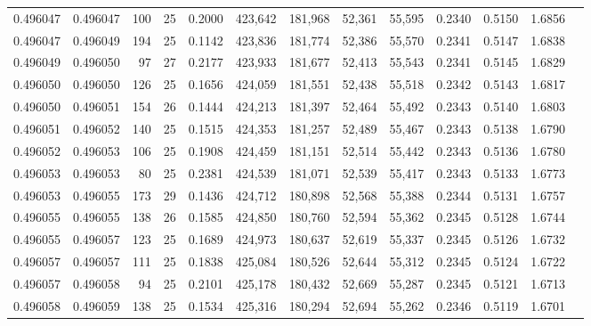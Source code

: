\begin{tabular}{rrrrrrrrrrrrr}
0.496047 & 0.496047 & 100 &  25 &                                     0.2000 & 423,642 & 181,968 &  52,361 &  55,595 & 0.2340 & 0.5150 & 1.6856 \\
0.496047 & 0.496049 & 194 &  25 &                                     0.1142 & 423,836 & 181,774 &  52,386 &  55,570 & 0.2341 & 0.5147 & 1.6838 \\
0.496049 & 0.496050 &  97 &  27 &                                     0.2177 & 423,933 & 181,677 &  52,413 &  55,543 & 0.2341 & 0.5145 & 1.6829 \\
0.496050 & 0.496050 & 126 &  25 &                                     0.1656 & 424,059 & 181,551 &  52,438 &  55,518 & 0.2342 & 0.5143 & 1.6817 \\
0.496050 & 0.496051 & 154 &  26 &                                     0.1444 & 424,213 & 181,397 &  52,464 &  55,492 & 0.2343 & 0.5140 & 1.6803 \\
0.496051 & 0.496052 & 140 &  25 &                                     0.1515 & 424,353 & 181,257 &  52,489 &  55,467 & 0.2343 & 0.5138 & 1.6790 \\
0.496052 & 0.496053 & 106 &  25 &                                     0.1908 & 424,459 & 181,151 &  52,514 &  55,442 & 0.2343 & 0.5136 & 1.6780 \\
0.496053 & 0.496053 &  80 &  25 &                                     0.2381 & 424,539 & 181,071 &  52,539 &  55,417 & 0.2343 & 0.5133 & 1.6773 \\
0.496053 & 0.496055 & 173 &  29 &                                     0.1436 & 424,712 & 180,898 &  52,568 &  55,388 & 0.2344 & 0.5131 & 1.6757 \\
0.496055 & 0.496055 & 138 &  26 &                                     0.1585 & 424,850 & 180,760 &  52,594 &  55,362 & 0.2345 & 0.5128 & 1.6744 \\
0.496055 & 0.496057 & 123 &  25 &                                     0.1689 & 424,973 & 180,637 &  52,619 &  55,337 & 0.2345 & 0.5126 & 1.6732 \\
0.496057 & 0.496057 & 111 &  25 &                                     0.1838 & 425,084 & 180,526 &  52,644 &  55,312 & 0.2345 & 0.5124 & 1.6722 \\
0.496057 & 0.496058 &  94 &  25 &                                     0.2101 & 425,178 & 180,432 &  52,669 &  55,287 & 0.2345 & 0.5121 & 1.6713 \\
0.496058 & 0.496059 & 138 &  25 &                                     0.1534 & 425,316 & 180,294 &  52,694 &  55,262 & 0.2346 & 0.5119 & 1.6701 \\

\end{tabular}
